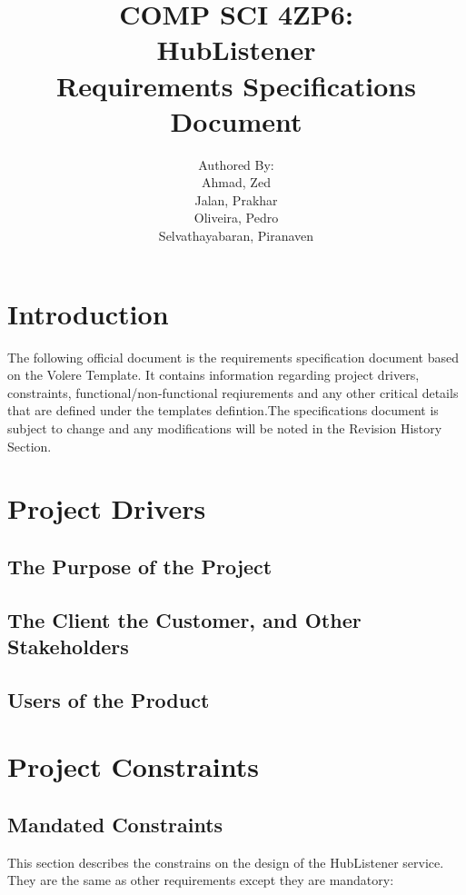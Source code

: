 \documentclass{article}
\title{COMP SCI 4ZP6:\\ \textbf{HubListener}\\ Requirements Specifications Document}
\author{ Authored By:
		\\ Ahmad, Zed
		\\ Jalan, Prakhar 
		\\ Oliveira, Pedro
		\\ Selvathayabaran, Piranaven
}
\date{}
\begin{document}
\newpage

\maketitle

\newpage
\tableofcontents {}

\section{Introduction}

The following official document is the requirements specification document based on the Volere Template. It contains information regarding project drivers, constraints, functional/non-functional reqiurements and  any other critical details that are defined under the templates defintion.The specifications document is subject to change and any modifications will be noted in the Revision History Section. 
\newpage
\section{Project Drivers}


\subsection{The Purpose of the Project}
\subsection{The Client the Customer, and Other Stakeholders}
\subsection{Users of the Product}



\newpage
\section{Project Constraints}
\subsection{Mandated Constraints}

This section describes the constrains on the design of the HubListener service. They are the same as other requirements except they are mandatory:\newline
\newline
\end{document}
